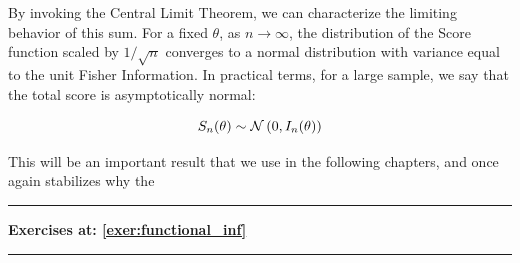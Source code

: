 By invoking the Central Limit Theorem, we can characterize the limiting behavior of this sum. For a fixed $\theta$, as $n \to \infty$, the distribution of the Score function scaled by $1/\sqrt{n}$ converges to a normal distribution with variance equal to the unit Fisher Information. In practical terms, for a large sample, we say that the total score is asymptotically normal:

\begin{equation}
	S_n(\theta) \sim \mathcal{N}\left(0, I_n(\theta)\right)
	\label{eq:Score_asymp}
\end{equation}

 This will be an important result that we use in the following chapters, and once again stabilizes why the 
 
 \vspace*{1cm}
 \hrule
 \begin{center}
 	\textbf{Exercises at: \ref{exer:functional_inf}}
 \end{center}
 \hrule